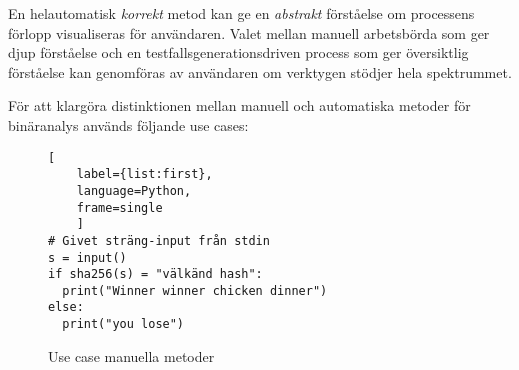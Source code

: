 

En helautomatisk \textit{korrekt} metod kan ge en \textit{abstrakt} förståelse
om processens förlopp visualiseras för användaren. Valet mellan manuell
arbetsbörda som ger djup förståelse och en testfallsgenerationsdriven process
som ger översiktlig förståelse kan genomföras av användaren om verktygen stödjer
hela spektrummet.

För att klargöra distinktionen mellan manuell och automatiska metoder för
binäranalys används följande use cases:

\begin{figure}
    \begin{lstlisting}[
    label={list:first},
    language=Python,
    frame=single
    ]
# Givet sträng-input från stdin
s = input()
if sha256(s) = "välkänd hash":
  print("Winner winner chicken dinner")
else:
  print("you lose")
\end{lstlisting}
    \caption{Use case manuella metoder}
\end{figure}

